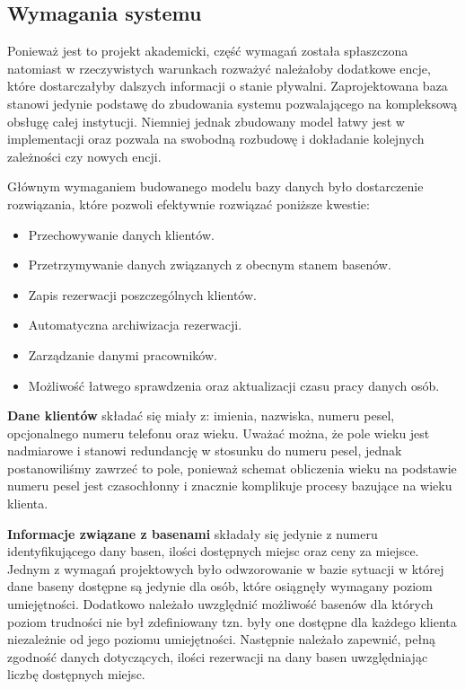 \documentclass[a4paper]{article}
\begin{document}
\subsection{Wymagania systemu} \label{Wymagania}

Ponieważ jest to projekt akademicki, część wymagań została spłaszczona natomiast w rzeczywistych warunkach rozważyć należałoby dodatkowe encje, które dostarczałyby dalszych informacji o stanie pływalni. Zaprojektowana baza stanowi jedynie podstawę do zbudowania systemu pozwalającego na kompleksową obsługę całej instytucji. Niemniej jednak zbudowany model łatwy jest w implementacji oraz pozwala na swobodną rozbudowę i dokładanie kolejnych zależności czy nowych encji.

Głównym wymaganiem budowanego modelu bazy danych było dostarczenie rozwiązania, które pozwoli efektywnie rozwiązać poniższe kwestie:
\begin{itemize}
    \item Przechowywanie danych klientów.
    \item Przetrzymywanie danych związanych z obecnym stanem basenów.
    \item Zapis rezerwacji poszczególnych klientów.
    \item Automatyczna archiwizacja rezerwacji.
    \item Zarządzanie danymi pracowników.
    \item Możliwość łatwego sprawdzenia oraz aktualizacji czasu pracy danych osób.
\end{itemize}

\textbf{Dane klientów} składać się miały z: imienia, nazwiska, numeru pesel, opcjonalnego numeru telefonu oraz wieku. Uważać można, że pole wieku jest nadmiarowe i stanowi redundancję w stosunku do numeru pesel, jednak postanowiliśmy zawrzeć to pole, ponieważ schemat obliczenia wieku na podstawie numeru pesel jest czasochłonny i znacznie komplikuje procesy bazujące na wieku klienta.

\textbf{Informacje związane z basenami} składały się jedynie z numeru identyfikującego dany basen, ilości dostępnych miejsc oraz ceny za miejsce. Jednym z wymagań projektowych było odwzorowanie w bazie sytuacji w której dane baseny dostępne są jedynie dla osób, które osiągnęły wymagany poziom umiejętności. Dodatkowo należało uwzględnić możliwość basenów dla których poziom trudności nie był zdefiniowany tzn. były one dostępne dla każdego klienta niezależnie od jego poziomu umiejętności. Następnie należało zapewnić, pełną zgodność danych dotyczących, ilości rezerwacji na dany basen uwzględniając liczbę dostępnych miejsc.
\end{document}

